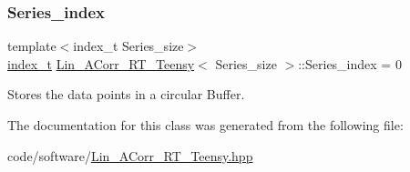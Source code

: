 \mbox{\label{classLin__ACorr__RT__Teensy_a495539383a4cab5ff611545361600599}} 
\subsubsection{\texorpdfstring{Series\+\_\+index}{Series\_index}}
{\footnotesize\ttfamily template$<$index\+\_\+t Series\+\_\+size$>$ \\
\hyperlink{types_8hpp_a7c40bb931c31595ed6308605f4537447}{index\+\_\+t} \hyperlink{classLin__ACorr__RT__Teensy}{Lin\+\_\+\+A\+Corr\+\_\+\+R\+T\+\_\+\+Teensy}$<$ Series\+\_\+size $>$\+::Series\+\_\+index = 0}



Stores the data points in a circular Buffer. 



The documentation for this class was generated from the following file\+:\begin{DoxyCompactItemize}
\item 
code/software/\hyperlink{Lin__ACorr__RT__Teensy_8hpp}{Lin\+\_\+\+A\+Corr\+\_\+\+R\+T\+\_\+\+Teensy.\+hpp}\end{DoxyCompactItemize}
